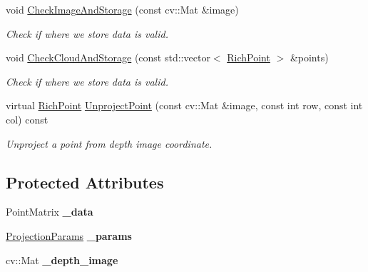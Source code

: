 \begin{DoxyCompactItemize}
\item 
void \hyperlink{classdepth__clustering_1_1CloudProjection_ad92d5819092ef3e4aabd4da3a5775f38}{Check\-Image\-And\-Storage} (const cv\-::\-Mat \&image)
\begin{DoxyCompactList}\small\item\em Check if where we store data is valid. \end{DoxyCompactList}\item 
void \hyperlink{classdepth__clustering_1_1CloudProjection_a595aa7f47ea9a934aaadff11f3709070}{Check\-Cloud\-And\-Storage} (const std\-::vector$<$ \hyperlink{classdepth__clustering_1_1RichPoint}{Rich\-Point} $>$ \&points)
\begin{DoxyCompactList}\small\item\em Check if where we store data is valid. \end{DoxyCompactList}\item 
virtual \hyperlink{classdepth__clustering_1_1RichPoint}{Rich\-Point} \hyperlink{classdepth__clustering_1_1CloudProjection_a684ca31033ee3b6b9d0ba2ea86d6e5b9}{Unproject\-Point} (const cv\-::\-Mat \&image, const int row, const int col) const 
\begin{DoxyCompactList}\small\item\em Unproject a point from depth image coordinate. \end{DoxyCompactList}\end{DoxyCompactItemize}
\subsection*{Protected Attributes}
\begin{DoxyCompactItemize}
\item 
\hypertarget{classdepth__clustering_1_1CloudProjection_a3f70579b10bd93a7d5ac4b1f0d387701}{Point\-Matrix {\bfseries \-\_\-data}}\label{classdepth__clustering_1_1CloudProjection_a3f70579b10bd93a7d5ac4b1f0d387701}

\item 
\hypertarget{classdepth__clustering_1_1CloudProjection_a8978a85d52212a2a88cbb3c6791eddd6}{\hyperlink{classdepth__clustering_1_1ProjectionParams}{Projection\-Params} {\bfseries \-\_\-params}}\label{classdepth__clustering_1_1CloudProjection_a8978a85d52212a2a88cbb3c6791eddd6}

\item 
\hypertarget{classdepth__clustering_1_1CloudProjection_a2d239a9a0fcaada00de36aad436e2af2}{cv\-::\-Mat {\bfseries \-\_\-depth\-\_\-image}}\label{classdepth__clustering_1_1CloudProjection_a2d239a9a0fcaada00de36aad436e2af2}

\end{DoxyCompactItemize}


